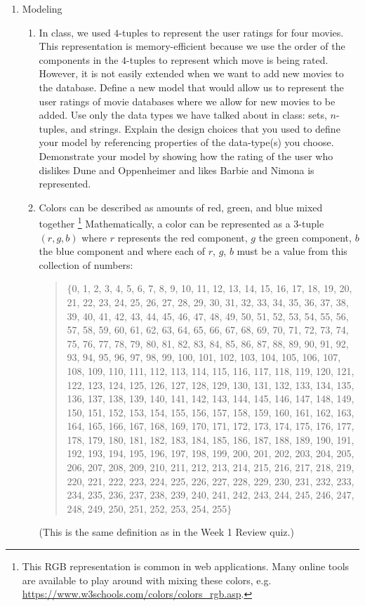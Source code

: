 \begin{enumerate}[labelindent=0pt, leftmargin=0pt]
    \item Modeling
    \begin{enumerate}[labelindent=0pt, leftmargin=0pt]
        \item\gradeCompleteFirst In class, we used $4$-tuples to represent the user ratings for four movies. 
        This representation is memory-efficient because we use the order of the components in the $4$-tuples to 
        represent which move is being rated. However, it is not easily extended when we want to add new movies to the database.
        Define a new model that would allow us to represent the user ratings of movie databases where we allow for new movies to be added.
        Use only the data types we have talked about in class: sets, $n$-tuples, and strings. Explain the design choices
        that you used to define your model by referencing properties of the data-type(s) you choose.
        Demonstrate your model by showing how the rating of the user who dislikes Dune and Oppenheimer and likes Barbie and Nimona
        is represented.
        
        \item\gradeComplete 
        Colors can be described as amounts of red, green, and blue mixed together
        \footnote{This RGB representation is common in web applications.  Many online tools are available to play around with mixing these colors,  e.g. \url{https://www.w3schools.com/colors/colors_rgb.asp}. }
        Mathematically, a color can be represented as a $3$-tuple $(r, g, b)$ where $r$ represents the red component, $g$ the green component, $b$ the blue component and where each of $r$, $g$, $b$ must be a value from this collection of numbers:
        \begin{quote}
        $\{$0, 1, 2, 3, 4, 5, 6, 7, 8, 9, 10, 11, 12, 13, 14, 15, 16, 17, 18, 19, 20, 21, 22, 23, 24, 25, 26, 27, 28, 29, 30, 31, 32, 33, 34, 35, 36, 37, 38, 39, 40, 41, 42, 43, 44, 45, 46, 47, 48, 49, 50, 51, 52, 53, 54, 55, 56, 57, 58, 59, 60, 61, 62, 63, 64, 65, 66, 67, 68, 69, 70, 71, 72, 73, 74, 75, 76, 77, 78, 79, 80, 81, 82, 83, 84, 85, 86, 87, 88, 89, 90, 91, 92, 93, 94, 95, 96, 97, 98, 99, 100, 101, 102, 103, 104, 105, 106, 107, 108, 109, 110, 111, 112, 113, 114, 115, 116, 117, 118, 119, 120, 121, 122, 123, 124, 125, 126, 127, 128, 129, 130, 131, 132, 133, 134, 135, 136, 137, 138, 139, 140, 141, 142, 143, 144, 145, 146, 147, 148, 149, 150, 151, 152, 153, 154, 155, 156, 157, 158, 159, 160, 161, 162, 163, 164, 165, 166, 167, 168, 169, 170, 171, 172, 173, 174, 175, 176, 177, 178, 179, 180, 181, 182, 183, 184, 185, 186, 187, 188, 189, 190, 191, 192, 193, 194, 195, 196, 197, 198, 199, 200, 201, 202, 203, 204, 205, 206, 207, 208, 209, 210, 211, 212, 213, 214, 215, 216, 217, 218, 219, 220, 221, 222, 223, 224, 225, 226, 227, 228, 229, 230, 231, 232, 233, 234, 235, 236, 237, 238, 239, 240, 241, 242, 243, 244, 245, 246, 247, 248, 249, 250, 251, 252, 253, 254, 255$\}$
        \end{quote}
        (This is the same definition as in the Week 1 Review quiz.)
        

\end{enumerate}
\end{enumerate}
